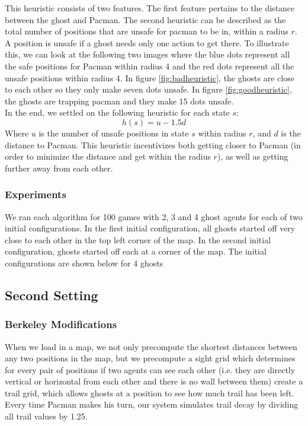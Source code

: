 \documentclass[11pt]{article}
\begin{document}
\begin{multicols}{2}
This heuristic consists of two features. The first feature pertains to the distance between the ghost and Pacman. The second heuristic can be described as the total number of positions that are unsafe for pacman to be in, within a radius $r$. A position is unsafe if a ghost needs only one action to get there. To illustrate this, we can look at the following two images where the blue dots represent all the safe positions for Pacman within radius 4 and the red dots represent all the unsafe positions within radius 4. In figure \ref{fig:badheuristic}, the ghosts are close to each other so they only make seven dots unsafe. In figure \ref{fig:goodheuristic}, the ghosts are trapping pacman and they make 15 dots unsafe.\\ 

In the end, we settled on the following heuristic for each state $s$:
$$h(s) = u - 1.5d$$ Where $u$ is the number of unsafe positions in state $s$ within radius $r$, and $d$ is the distance to Pacman. This heuristic incentivizes both getting closer to Pacman (in order to minimize the distance and get within the radius $r$), as well as getting further away from each other.



\subsubsection{Experiments}
We ran each algorithm for 100 games with 2, 3 and 4 ghost agents for each of two initial configurations. In the first initial configuration, all ghosts started off very close to each other in the top left corner of the map. In the second initial configuration, ghosts started off each at a corner of the map. The initial configurations are shown below for 4 ghosts

\subsection{Second Setting}

\subsubsection{Berkeley Modifications}
When we load in a map, we not only precompute the shortest distances between any two positions in the map, but we precompute a sight grid which determines for every pair of positions if two agents can see each other (i.e. they are directly vertical or horizontal from each other and there is no wall between them) create a trail grid, which allows ghosts at a position to see how much trail has been left. Every time Pacman makes his turn, our system simulates trail decay by dividing all trail values by 1.25.  


\end{multicols}
\end{document}
